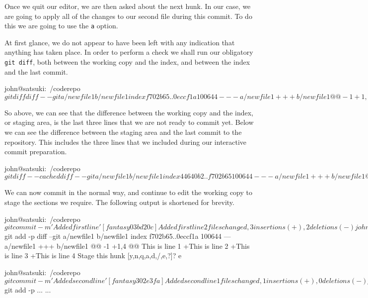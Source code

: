 Once we quit our editor, we are then asked about the next hunk.
In our case, we are going to apply all of the changes to our second file during this commit.
To do this we are going to use the \texttt{a} option.


At first glance, we do not appear to have been left with any indication that anything has taken place.
In order to perform a check we shall run our obligatory \texttt{git diff}, both between the working copy and the index, and between the index and the last commit.

\begin{code}
john@satsuki:~/coderepo$ git diff
diff --git a/newfile1 b/newfile1
index f702b65..0eccf1a 100644
--- a/newfile1
+++ b/newfile1
@@ -1 +1,4 @@
 This is line 1
+This is line 2
+This is line 3
+This is line 4
john@satsuki:~/coderepo$
\end{code}

So above, we can see that the difference between the working copy and the index, or staging area, is the last three lines that we are not ready to commit yet.
Below we can see the difference between the staging area and the last commit to the repository.
This includes the three lines that we included during our interactive commit preparation.

\begin{code}
john@satsuki:~/coderepo$ git diff --cached
diff --git a/newfile1 b/newfile1
index 44640b2..f702b65 100644
--- a/newfile1
+++ b/newfile1
@@ -1,2 +1 @@
-A new file
-and some more awesome changes
+This is line 1
diff --git a/newfile2 b/newfile2
index 3545c1d..40efcce 100644
--- a/newfile2
+++ b/newfile2
@@ -1,2 +1,4 @@
 Another new file
 and a new awesome feature
+This is a new line
+This is another new line
john@satsuki:~/coderepo$
\end{code}

We can now commit in the normal way, and continue to edit the working copy to stage the sections we require.
The following output is shortened for brevity.

\begin{code}
john@satsuki:~/coderepo$ git commit -m 'Added first line'
[fantasy 03bd20c] Added first line
 2 files changed, 3 insertions(+), 2 deletions(-)
john@satsuki:~/coderepo$ git add -p
diff --git a/newfile1 b/newfile1
index f702b65..0eccf1a 100644
--- a/newfile1
+++ b/newfile1
@@ -1 +1,4 @@
 This is line 1
+This is line 2
+This is line 3
+This is line 4
Stage this hunk [y,n,q,a,d,/,e,?]? e

john@satsuki:~/coderepo$ git commit -m 'Added second line'
[fantasy 302e3fa] Added second line
 1 files changed, 1 insertions(+), 0 deletions(-)
john@satsuki:~/coderepo$ git add -p
...
...
\end{code}

